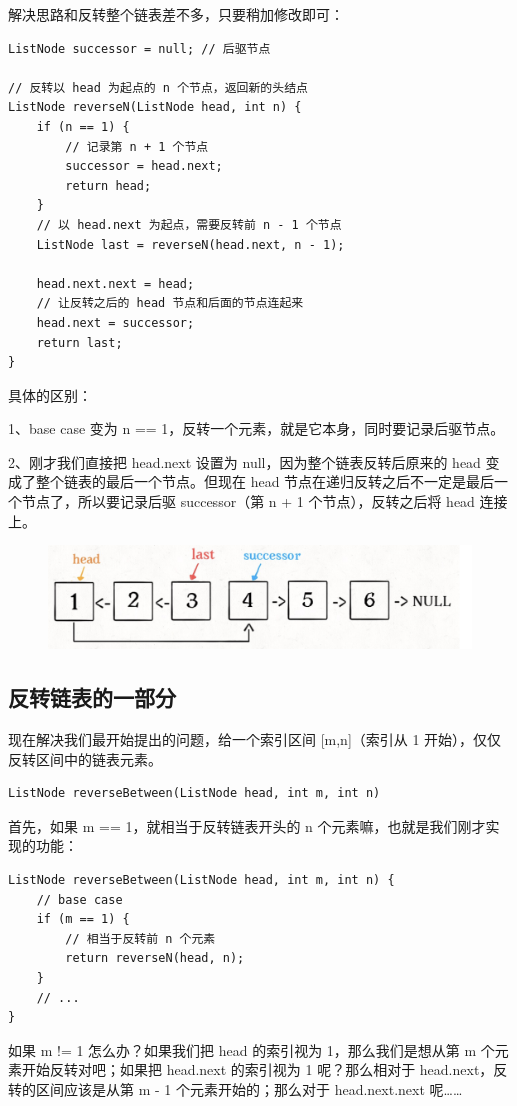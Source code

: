 \documentclass[12pt]{article}
\begin{document}
解决思路和反转整个链表差不多，只要稍加修改即可：
\begin{lstlisting}
ListNode successor = null; // 后驱节点

// 反转以 head 为起点的 n 个节点，返回新的头结点
ListNode reverseN(ListNode head, int n) {
    if (n == 1) { 
        // 记录第 n + 1 个节点
        successor = head.next;
        return head;
    }
    // 以 head.next 为起点，需要反转前 n - 1 个节点
    ListNode last = reverseN(head.next, n - 1);

    head.next.next = head;
    // 让反转之后的 head 节点和后面的节点连起来
    head.next = successor;
    return last;
}    
\end{lstlisting}

具体的区别：

1、base case 变为 n == 1，反转一个元素，就是它本身，同时要记录后驱节点。

2、刚才我们直接把 head.next 设置为 null，因为整个链表反转后原来的 head 变成了整个链表的最后一个节点。但现在 head 节点在递归反转之后不一定是最后一个节点了，所以要记录后驱 successor（第 n + 1 个节点），反转之后将 head 连接上。
\begin{figure}[H]
    \centering
    \includegraphics[width=.5\textwidth]{fig/Reverse_Single_List_8.png}
\end{figure}

\subsection{反转链表的一部分}
现在解决我们最开始提出的问题，给一个索引区间 [m,n]（索引从 1 开始），仅仅反转区间中的链表元素。
\begin{lstlisting}
ListNode reverseBetween(ListNode head, int m, int n)
\end{lstlisting}

首先，如果 m == 1，就相当于反转链表开头的 n 个元素嘛，也就是我们刚才实现的功能：
\begin{lstlisting}
ListNode reverseBetween(ListNode head, int m, int n) {
    // base case
    if (m == 1) {
        // 相当于反转前 n 个元素
        return reverseN(head, n);
    }
    // ...
}
\end{lstlisting}

如果 m != 1 怎么办？如果我们把 head 的索引视为 1，那么我们是想从第 m 个元素开始反转对吧；如果把 head.next 的索引视为 1 呢？那么相对于 head.next，反转的区间应该是从第 m - 1 个元素开始的；那么对于 head.next.next 呢……
\end{document}

